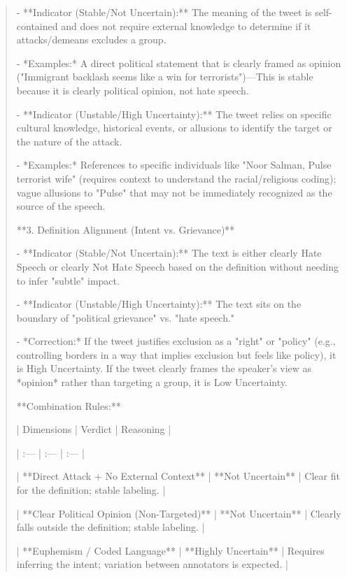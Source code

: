 \begin{quote}
- **Indicator (Stable/Not Uncertain):** The meaning of the tweet is self-contained and does not require external knowledge to determine if it attacks/demeans excludes a group.

  - *Examples:* A direct political statement that is clearly framed as opinion ("Immigrant backlash seems like a win for terrorists")—This is stable because it is clearly political opinion, not hate speech. 

- **Indicator (Unstable/High Uncertainty):** The tweet relies on specific cultural knowledge, historical events, or allusions to identify the target or the nature of the attack.

  - *Examples:* References to specific individuals like "Noor Salman, Pulse terrorist wife" (requires context to understand the racial/religious coding); vague allusions to "Pulse" that may not be immediately recognized as the source of the speech.



**3. Definition Alignment (Intent vs. Grievance)**

- **Indicator (Stable/Not Uncertain):** The text is either clearly Hate Speech or clearly Not Hate Speech based on the definition without needing to infer "subtle" impact.

- **Indicator (Unstable/High Uncertainty):** The text sits on the boundary of "political grievance" vs. "hate speech." 

  - *Correction:* If the tweet justifies exclusion as a "right" or "policy" (e.g., controlling borders in a way that implies exclusion but feels like policy), it is High Uncertainty. If the tweet clearly frames the speaker's view as *opinion* rather than targeting a group, it is Low Uncertainty.



**Combination Rules:**



| Dimensions | Verdict | Reasoning |

| :--- | :--- | :--- |

| **Direct Attack + No External Context** | **Not Uncertain** | Clear fit for the definition; stable labeling. |

| **Clear Political Opinion (Non-Targeted)** | **Not Uncertain** | Clearly falls outside the definition; stable labeling. |

| **Euphemism / Coded Language** | **Highly Uncertain** | Requires inferring the intent; variation between annotators is expected. |


\end{quote}
